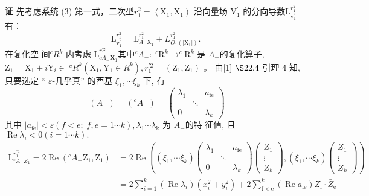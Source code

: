 \documentclass[12pt,a4paper,UTF8]{ctexart}
\begin{document}
\textbf{证 }先考虑系统 (3) 第一式，二次型$r_{1}^{2}=\left\langle \mathrm{X}_{1}, \mathrm{X}_{1}\right) $ 沿向量场  $\mathrm{V}_{1}^{\prime}$  的分向导数$\mathrm{L}_{\mathrm{v}_{1}^{\prime}}^{r_{1}^{2}}$有：  
$$\mathrm{L}_{\mathrm{v}_{1}^{\prime}}^{r_{1}^{2}}=\mathrm{L}_{A_{-} \mathrm{X}_{1}}^{r_{1}^{2}}+L_{O_{1}\left(\left|\mathrm{X}_{1}\right|\right)}^{r_1^2}.\;$$
在复化空 间$^{c} R^{k} $ 内考虑  $\mathrm{L}_{c A_{-} \mathbf{X}_{1}  }^{r_{1}^{\prime 2}} $其中$^{c}A_{-}:\; ^{c}\mathrm{R}^{k} \rightarrow ^{c}\mathrm{R}^{k}$ 是 $ A_{-} $的复化算子,  $\mathrm{Z}_{1}=\mathrm{X}_{1}+  i\mathrm{Y}_i\in\;^{c} R^{k}\left(\mathrm{X}_{1}, \mathrm{Y}_{1} \in R^{k}\right), r_{1}^{\prime 2}=\left(\mathrm{Z}_{1}, \mathrm{Z}_{1}\right) $ 。
由[1]  $\S  22.4$  引理 4 知, 只要选定 “  $\varepsilon$-几乎真” 的酉基 $ \xi_{1}, \cdots \xi_{k} $ 下, 有 
$$\left(A_{-}\right)=\left({ }^{c} A_{-}\right)=\left(\begin{array}{ccc}
	\lambda_{1} & & a_{\mathrm{fe}} \\
	& \ddots & \\
	0 & & \lambda_{k}
	\end{array}\right)$$
 其中 $ \left|a_{\mathrm{fe}}\right|<\varepsilon\left(f<e ;\;f, e=1\cdots k\right), \lambda_{1} \cdots \lambda_{\mathrm{k}} $ 为 $ A_{-} $的特 征值, 且 $ \operatorname{Re} \lambda_{i}<0 (i=1\cdots k) .$ 
$$
\begin{aligned}
\mathrm{L}_{{ }^{c} A_{-} Z_{1}}^{r_{1}^{\prime 2}}=2 \operatorname{Re}\left({ }^{c} A_{-} \mathrm{Z}_{1}, \mathrm{Z}_{1}\right)&=2 \operatorname{Re}\left(\left(\xi_{1}, \cdots \xi_{k}\right)
\left(\begin{array}{ccc}
	\lambda_{1} & & a_{\mathrm{fe}} \\
	& \ddots & \\
	0 & & \lambda_{k}
	\end{array}\right)
\left(\begin{array}{c}
Z_{1} \\
\vdots \\
Z_{k}
\end{array}\right),
\left(\xi_{1}, \cdots \xi_{k}\right)\left(\begin{array}{c}
Z_{1} \\
\vdots \\
Z_{k}
\end{array}\right)
\right)\\
&=2 \sum_{i=1}^{k}\left(\operatorname{Re} \lambda_{i}\right)\left(x_{i}^{2}+y_{i}^{2}\right)+2 \sum_{\mathrm{f<e}}^{k}\left(\operatorname{Re} a_{\mathrm{fe}}\right) Z_{\mathrm{f}} \cdot \bar{Z}_{\mathrm{e}}
\end{aligned}
$$
\end{document}
